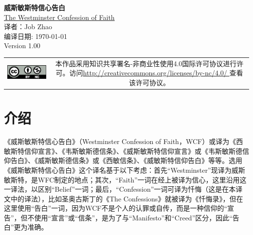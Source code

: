 \documentclass[12pt, a4paper, oneside]{ctexart}
\begin{document}
\setcounter{page}{0}
\begin{center}
	\Large{\textbf{威斯敏斯特信心告白}} \\ \vspace{2em}
	\small{\href{https://westminsterstandards.org/westminster-confession-of-faith/}{The Westminster Confession of Faith}} \\ \vspace{1em}
	\small{译者：Job Zhao} \\ \vspace{1em}
	\small{编译日期: \today} \\ \vspace{1em}
	\small{Version 1.00} \\ \vspace{1em}
\end{center}
\vfill
\vspace{28em}
\begin{tabular*}{\textwidth}{cc}
	\includegraphics{figure/by-nc.eps}
	& \begin{minipage}[b]{0.6\textwidth}
		\footnotesize
		本作品采用知识共享署名-非商业性使用4.0国际许可协议进行许可。访问\url{http://creativecommons.org/licenses/by-nc/4.0/ }查看该许可协议。
	\end{minipage}
\end{tabular*}
\vspace{2mm}
\thispagestyle{empty}

\newpage
{}
\setcounter{page}{1}
\tableofcontents
\newpage
\setcounter{page}{1}

\section*{介绍}

《威斯敏斯特信心告白》（Westminster Confession of Faith，WCF）或译为《西敏斯特信仰宣言》、《韦斯敏斯德信条》、《威斯敏斯特信仰宣言》或《韦斯敏斯德信仰告白》、《威斯敏斯德信条》或《西敏信条》、《威敏斯特信仰告白》等等。选用《威斯敏斯特信心告白》这个译名基于以下考虑：首先“Westminster”现译为威斯敏斯特，是WFC制定的地点；其次，“Faith”一词在经上被译为信心，这里沿用这一译法，以区别“Belief”一词；最后，“Confession”一词可译为忏悔（这是在本译文中的译法），比如圣奥古斯丁的《The Confessions》就被译为《忏悔录》，但在这里使用“告白”一词，因为WCF不是个人的认罪或自传，而是一种信仰的“宣告”，但不使用“宣言”或“信条”，是为了与“Manifesto”和“Creed”区分，因此“告白”更为准确。
\end{document}
